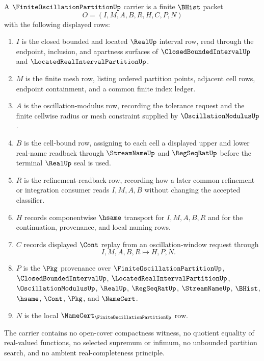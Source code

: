 \begin{definition}
\label{def:finite-oscillation-partition-carrier}
A $\FiniteOscillationPartitionUp$ carrier is a finite $\BHist$ packet
$$
O=(I,M,A,B,R,H,C,P,N)
$$
with the following displayed rows:
\begin{enumerate}
\item $I$ is the closed bounded and located $\RealUp$ interval row, read through the endpoint, inclusion, and apartness surfaces of $\ClosedBoundedIntervalUp$ and $\LocatedRealIntervalPartitionUp$.
\item $M$ is the finite mesh row, listing ordered partition points, adjacent cell rows, endpoint containment, and a common finite index ledger.
\item $A$ is the oscillation-modulus row, recording the tolerance request and the finite cellwise radius or mesh constraint supplied by $\OscillationModulusUp$.
\item $B$ is the cell-bound row, assigning to each cell a displayed upper and lower real-name readback through $\StreamNameUp$ and $\RegSeqRatUp$ before the terminal $\RealUp$ seal is used.
\item $R$ is the refinement-readback row, recording how a later common refinement or integration consumer reads $I,M,A,B$ without changing the accepted classifier.
\item $H$ records componentwise $\hsame$ transport for $I,M,A,B,R$ and for the continuation, provenance, and local naming rows.
\item $C$ records displayed $\Cont$ replay from an oscillation-window request through
$$
I,M,A,B,R \longmapsto H,P,N .
$$
\item $P$ is the $\Pkg$ provenance over $\FiniteOscillationPartitionUp$, $\ClosedBoundedIntervalUp$, $\LocatedRealIntervalPartitionUp$, $\OscillationModulusUp$, $\RealUp$, $\RegSeqRatUp$, $\StreamNameUp$, $\BHist$, $\hsame$, $\Cont$, $\Pkg$, and $\NameCert$.
\item $N$ is the local $\NameCert_{\FiniteOscillationPartitionUp}$ row.
\end{enumerate}
The carrier contains no open-cover compactness witness, no quotient equality of real-valued functions, no selected supremum or infimum, no unbounded partition search, and no ambient real-completeness principle.
\end{definition}

